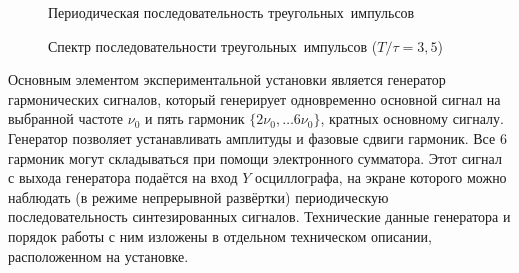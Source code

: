 \begin{figure}[t]
\begin{minipage}{0.45\textwidth}
	\caption{Периодическая последовательность треугольных~импульсов}
\end{minipage}
\hfill
\begin{minipage}{0.45\textwidth}
	\caption{Спектр последовательности треугольных~импульсов
($T/\tau=3,5$)}
\end{minipage}
\end{figure}

\experiment
Основным элементом экспериментальной установки является генератор гармонических
сигналов, который генерирует одновременно основной сигнал на выбранной частоте
$\nu_0$ и пять гармоник $\{2\nu_0,\ldots 6\nu_0\}$, кратных основному сигналу.
Генератор позволяет устанавливать амплитуды и фазовые сдвиги гармоник.
Все 6 гармоник могут складываться при помощи электронного сумматора. Этот сигнал
с выхода генератора подаётся на вход $Y$ осциллографа, на экране которого
можно наблюдать (в режиме непрерывной развёртки) периодическую
последовательность синтезированных сигналов. Технические
данные генератора и порядок работы с ним изложены в отдельном техническом
описании, расположенном на установке.

